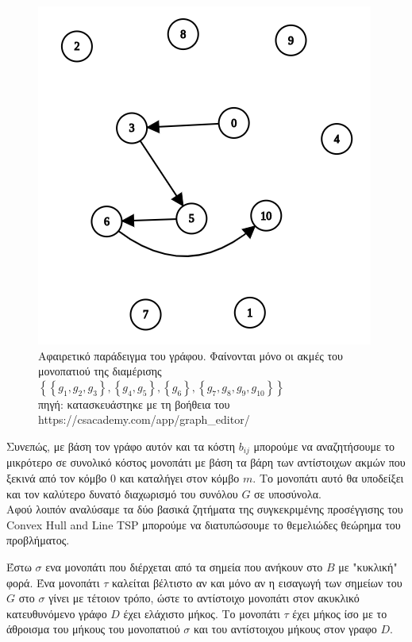 \documentclass[oneside,12pt]{book}
\newenvironment{matlab}
	{\begin{figure}[hp]\centering\captionsetup{justification=centering}}
	{\end{figure}}
\theoremstyle{definition}
\begin{document}
\begin{matlab}
	\includegraphics[scale=0.5]{images/graph.png}
	\caption{Αφαιρετικό παράδειγμα του γράφου. Φαίνονται μόνο οι ακμές του μονοπατιού της διαμέρισης \(\left\{ \left\{ g_1,g_2,g_3 \right\}, \left\{ g_4,g_5 \right\}, \left\{ g_6 \right\}, \left\{ g_7,g_8,g_9, g_{10} \right\}\right\}\) \\ πηγή: κατασκευάστηκε με τη βοήθεια του https://csacademy.com/app/graph\_editor/}
\end{matlab}

Συνεπώς, με βάση τον γράφο αυτόν και τα κόστη \(b_{ij}\) μπορούμε να αναζητήσουμε το μικρότερο σε συνολικό κόστος μονοπάτι με βάση τα βάρη των αντίστοιχων ακμών που ξεκινά από τον κόμβο 0 και καταλήγει στον κόμβο \(m\). Το μονοπάτι αυτό θα υποδείξει και τον καλύτερο δυνατό διαχωρισμό του συνόλου \(G\) σε υποσύνολα. \\

Αφού λοιπόν αναλύσαμε τα δύο βασικά ζητήματα της συγκεκριμένης προσέγγισης του Convex Hull and Line TSP μπορούμε να διατυπώσουμε το θεμελιώδες θεώρημα του προβλήματος. \\

\begin{mytheorem}{}{}
	Έστω \(σ\) ενα μονοπάτι που διέρχεται από τα σημεία που ανήκουν στο \(B\) με "κυκλική" φορά. Ένα μονοπάτι \(τ\) καλείται βέλτιστο αν και μόνο αν η εισαγωγή των σημείων του \(G\) στο \(σ\) γίνει με τέτοιον τρόπο, ώστε το αντίστοιχο μονοπάτι στον ακυκλικό κατευθυνόμενο γράφο \(D\) έχει ελάχιστο μήκος. Το μονοπάτι \(τ\) έχει μήκος ίσο με το άθροισμα του μήκους του μονοπατιού \(σ\) και του αντίστοιχου μήκους στον γραφο \(D\).
\end{mytheorem}
\end{document}
